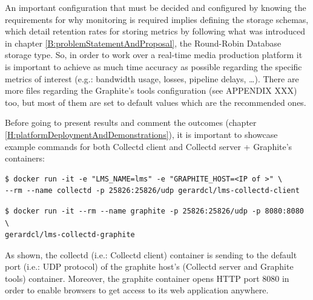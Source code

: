 An important configuration that must be decided and configured by knowing the requirements for why monitoring is required implies defining the storage schemas, which detail retention rates for storing metrics by following what was introduced in chapter \ref{B:problemStatementAndProposal}, the Round-Robin Database storage type. So, in order to work over a real-time media production platform it is important to achieve as much time accuracy as possible regarding the specific metrics of interest (e.g.: bandwidth usage, losses, pipeline delays, \ldots). There are more files regarding the Graphite's tools configuration (see APPENDIX XXX) too, but most of them are set to default values which are the recommended ones. 

Before going to present results and comment the outcomes (chapter \ref{H:platformDeploymentAndDemonstrations}), it is important to showcase example commands for both Collectd client and Collectd server + Graphite's containers:

\begin{verbatim}
$ docker run -it -e "LMS_NAME=lms" -e "GRAPHITE_HOST=<IP of >" \
--rm --name collectd -p 25826:25826/udp gerardcl/lms-collectd-client
\end{verbatim}

\begin{verbatim}
$ docker run -it --rm --name graphite -p 25826:25826/udp -p 8080:8080 \
gerardcl/lms-collectd-graphite
\end{verbatim}

As shown, the collectd (i.e.: Collectd client) container is sending to the default port (i.e.: UDP protocol) of the graphite host's (Collectd server and Graphite tools) container. Moreover, the graphite container opens HTTP port 8080 in order to enable browsers to get access to its web application anywhere. 